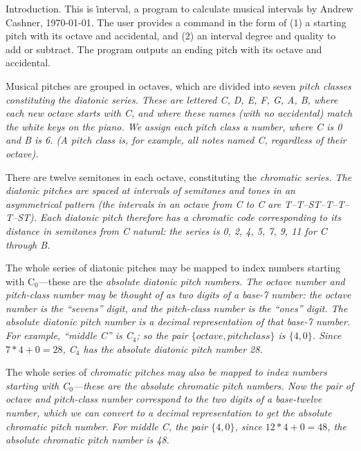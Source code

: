 
%

\def\title{Interval Calculator}
\def\emph #1{\bgroup\it#1\/\egroup}
\def\term{\emph}
\def\q#1{``#1''}


Introduction.
This is \.{interval}, a program to calculate musical intervals by Andrew
Cashner, \today.
The user provides a command in the form of (1) a starting pitch with its octave
and accidental, and (2) an interval degree and quality to add or subtract.
The program outputs an ending pitch with its octave and accidental.

Musical pitches are grouped in octaves, which are divided into seven
\term{pitch classes} constituting the \term{diatonic series}.
These are lettered C, D, E, F, G, A, B, where each new octave starts
with C, and where these names (with no accidental) match the white keys on the
piano.
We assign each pitch class a number, where C is 0 and B is 6.
(A \term{pitch class} is, for example, all notes named C, regardless of their
octave).

There are twelve semitones in each octave, constituting the \term{chromatic
series}.
The diatonic pitches are spaced at intervals of semitones and tones in an
asymmetrical pattern (the intervals in an octave from C to C are
T--T--ST--T--T--T--ST).
Each diatonic pitch therefore has a chromatic code corresponding to its
distance
in semitones from C natural: the series is 0, 2, 4, 5, 7, 9, 11 for C through
B.

The whole series of diatonic pitches may be mapped to index numbers starting
with C$_0$---these are the \term{absolute diatonic pitch numbers}.
The octave number and pitch-class number may be thought of as two digits of a
base-7 number: the octave number is the \q{sevens} digit, and the pitch-class
number is the \q{ones} digit.
The absolute diatonic pitch number is a decimal representation of that base-7
number.
For example, \q{middle C} is C$_4$; so the pair $\{octave, pitch class\}$
is $\{4, 0\}$.
Since $7 * 4 + 0 = 28$, C$_4$ has the absolute diatonic pitch number 28.

The whole series of \emph{chromatic} pitches may also be mapped to index
numbers
starting with C$_0$---these are the \term{absolute chromatic pitch numbers}.
Now the pair of octave and pitch-class number correspond to the two digits of a
base-\emph{twelve} number, which we can convert to a decimal representation to
get the absolute chromatic pitch number.
For middle C, the pair $\{4, 0\}$, since $12 * 4 + 0 = 48$, the absolute
chromatic pitch number is 48.

